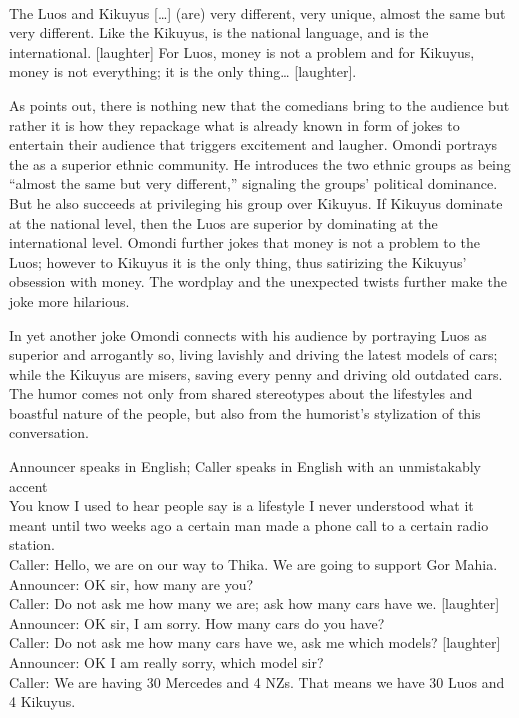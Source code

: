 \documentclass[output=paper]{langsci/langscibook}
\begin{document}
\\
\smallskip
  The Luos and Kikuyus […] (are) very different, very unique, almost the same but very different. Like the Kikuyus,  is the national language, and  is the international.\textup{ [laughter]} For Luos, money is not a problem and for Kikuyus, money is not everything; it is the only thing… \textup{[laughter]. }
  \citep{Churchill2011} 
\z

As \citet{Apte1985} points out, there is nothing new that the comedians bring to the audience but rather it is how they repackage what is already known in form of jokes to entertain their audience that triggers excitement and laugher. Omondi portrays the  as a superior ethnic community. He introduces the two ethnic groups as being “almost the same but very different,” signaling the groups’ political dominance. But he also succeeds at privileging his  group over Kikuyus. If Kikuyus dominate at the national level, then the Luos are superior by dominating at the international level. Omondi further jokes that money is not a problem to the Luos; however to Kikuyus it is the only thing, thus satirizing the Kikuyus’ obsession with money. The wordplay and the unexpected twists further make the joke more hilarious. 

In yet another joke Omondi connects with his audience by portraying Luos  as superior and arrogantly so, living lavishly and driving the latest models of cars; while the Kikuyus are misers, saving every penny and driving old outdated cars. The humor comes not only from shared stereotypes about the lifestyles and boastful nature of the  people, but also from the humorist’s stylization of this conversation.

\ea
{Announcer speaks in English; Caller speaks in English with an unmistakably  accent}\\
\smallskip
You know I used to hear people say  is a lifestyle I never understood what it meant until two weeks ago a certain  man made a phone call to a certain radio station. \\
\textup{Caller}: Hello, we are on our way to Thika. We are going to support Gor Mahia. \\
\textup{Announcer}: OK sir, how many are you?\\
\textup{Caller}: Do not ask me how many we are; ask how many cars have we. \textup{[laughter]}\\
\textup{Announcer}: OK sir, I am sorry. How many cars do you have?\\
\textup{Caller}: Do not ask me how many cars have we, ask me which models? \textup{[laughter]}\\
\textup{Announcer}: OK I am really sorry, which model sir?\\
\textup{Caller}: We are having 30 Mercedes and 4 NZs. That means we have 30 Luos and 4 Kikuyus. 
\citep{Churchill2011}
\z
\end{document}
